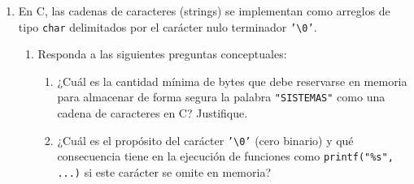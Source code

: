 \documentclass[11pt,letterpaper]{article}
\begin{document}
\begin{enumerate}[label=\textbf{\arabic*.}]
\begin{enumerate}[label=(\alph*), resume]
        \begin{solucionbox}
        \textbf{Solución y Explicación:}
        
        \begin{lstlisting}[style=customc]
#include <stdio.h>

int main(void) {
    int A[] = {5, 10, 4, 8, 2, 9, 3};
    int n = sizeof(A) / sizeof(A[0]);
    int picos[n];
    int total_picos = 0;

    // Recorrido seguro de los elementos interiores (1 a n-2)
    for (int i = 1; i < n - 1; i++) {
        if (A[i] > A[i - 1] && A[i] > A[i + 1]) {
            picos[total_picos] = A[i];
            total_picos++;
        }
    }

    // Reporte de resultados
    if (total_picos > 0) {
        printf("Picos encontrados (%d): ", total_picos);
        for (int j = 0; j < total_picos; j++) {
            printf("%d ", picos[j]);
        }
        printf("\n");
    } else {
        printf("Picos encontrados (0): ninguno\n");
    }

    return 0;
}
        \end{lstlisting}
        \end{solucionbox}
    \end{enumerate}

    \newpage
    \item En C, las cadenas de caracteres (strings) se implementan como arreglos de tipo \texttt{char} delimitados por el carácter nulo terminador \texttt{'\textbackslash 0'}.
    
    \begin{enumerate}[label=(\alph*)]
        \item Responda a las siguientes preguntas conceptuales:
        \begin{enumerate}[label=\arabic*.]
            \item ¿Cuál es la cantidad mínima de bytes que debe reservarse en memoria para almacenar de forma segura la palabra \texttt{"SISTEMAS"} como una cadena de caracteres en C? Justifique.
            \item ¿Cuál es el propósito del carácter \texttt{'\textbackslash 0'} (cero binario) y qué consecuencia tiene en la ejecución de funciones como \texttt{printf("\%s", ...)} si este carácter se omite en memoria?
        \end{enumerate}


\end{enumerate}
\end{enumerate}
\end{document}
